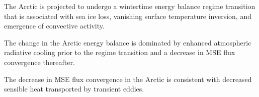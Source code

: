 \documentclass[draft]{agujournal2019}
\begin{document}




\begin{keypoints}
\item The Arctic is projected to undergo a wintertime energy balance regime transition that is associated with sea ice loss, vanishing surface temperature inversion, and emergence of convective activity.
\item The change in the Arctic energy balance is dominated by enhanced atmospheric radiative cooling prior to the regime transition and a decrease in MSE flux convergence thereafter.
\item The decrease in MSE flux convergence in the Arctic is consistent with decreased sensible heat transported by transient eddies. 
\end{keypoints}

%
%

%
%
\end{document}
